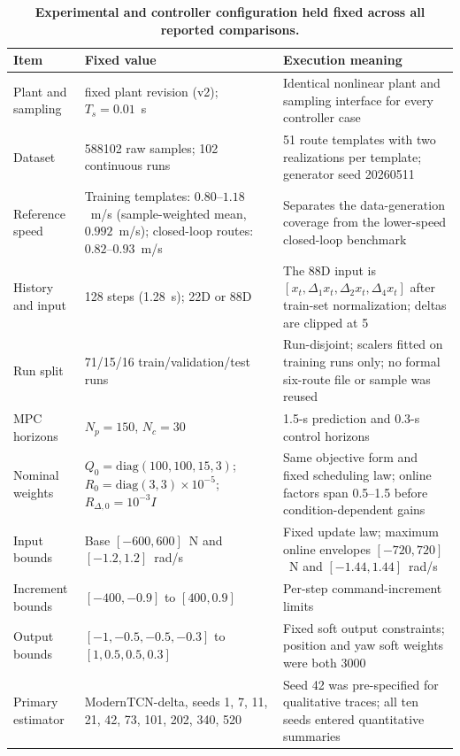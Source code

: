 \documentclass{ieeeaccess}
\begin{document}
\begin{table}[!t]
\centering
\caption{\textbf{Experimental and controller configuration held fixed across all reported comparisons.}}
\label{tab:frozen_experimental_configuration}
\scriptsize
\setlength{\tabcolsep}{3.4pt}
\setlength{\tabcolsep}{3pt}
\begin{tabular}{|p{}|p{}|p{}|}
\hline
Item & Fixed value & Execution meaning \\
\hline
Plant and sampling & fixed plant revision (v2); $T_s=0.01$~s & Identical nonlinear plant and sampling interface for every controller case \\
Dataset & 588102 raw samples; 102 continuous runs & 51 route templates with two realizations per template; generator seed 20260511 \\
Reference speed & Training templates: \mbox{$0.80$--$1.18$~m/s} (sample-weighted mean, $0.992$~m/s); closed-loop routes: \mbox{$0.82$--$0.93$~m/s} & Separates the data-generation coverage from the lower-speed closed-loop benchmark \\
History and input & 128 steps (1.28~s); 22D or 88D & The 88D input is $[x_t,\Delta_1x_t,\Delta_2x_t,\Delta_4x_t]$ after train-set normalization; deltas are clipped at 5 \\
Run split & 71/15/16 train/validation/test runs & Run-disjoint; scalers fitted on training runs only; no formal six-route file or sample was reused \\
MPC horizons & $N_p=150$, $N_c=30$ & 1.5-s prediction and 0.3-s control horizons \\
Nominal weights & $Q_0=\mathrm{diag}(100,100,15,3)$; $R_0=\mathrm{diag}(3,3)\!\times\!10^{-5}$; $R_{\Delta,0}=10^{-3}I$ & Same objective form and fixed scheduling law; online factors span 0.5--1.5 before condition-dependent gains \\
Input bounds & Base $[-600,600]$~N and $[-1.2,1.2]$~rad/s & Fixed update law; maximum online envelopes $[-720,720]$~N and $[-1.44,1.44]$~rad/s \\
Increment bounds & $[-400,-0.9]$ to $[400,0.9]$ & Per-step command-increment limits \\
Output bounds & $[-1,-0.5,-0.5,-0.3]$ to $[1,0.5,0.5,0.3]$ & Fixed soft output constraints; position and yaw soft weights were both 3000 \\
Primary estimator & ModernTCN-delta, seeds 1, 7, 11, 21, 42, 73, 101, 202, 340, 520 & Seed 42 was pre-specified for qualitative traces; all ten seeds entered quantitative summaries \\
\hline
\end{tabular}
\end{table}
\end{document}

